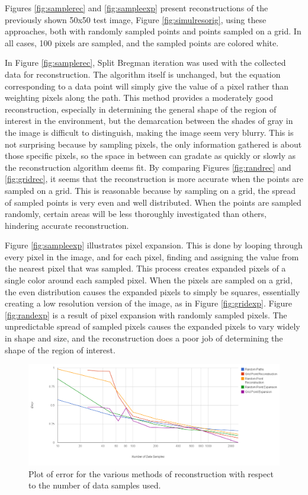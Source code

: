 \documentclass[english]{article}\usepackage[]{graphicx}\usepackage[]{color}
\begin{document}
Figures \ref{fig:samplerec} and \ref{fig:sampleexp} present reconstructions of the previously shown 50x50 test image, Figure \ref{fig:simulresorig}, using these approaches, both with randomly sampled points and points sampled on a grid. In all cases, 100 pixels are sampled, and the sampled points are colored white.

In Figure \ref{fig:samplerec}, Split Bregman iteration was used with the collected data for reconstruction. The algorithm itself is unchanged, but the equation corresponding to a data point will simply give the value of a pixel rather than weighting pixels along the path. This method provides a moderately good reconstruction, especially in determining the general shape of the region of interest in the environment, but the demarcation between the shades of gray in the image is difficult to distinguish, making the image seem very blurry. This is not surprising because by sampling pixels, the only information gathered is about those specific pixels, so the space in between can gradate as quickly or slowly as the reconstruction algorithm deems fit. By comparing Figures \ref{fig:randrec} and \ref{fig:gridrec}, it seems that the reconstruction is more accurate when the points are sampled on a grid. This is reasonable because by sampling on a grid, the spread of sampled points is very even and well distributed. When the points are sampled randomly, certain areas will be less thoroughly investigated than others, hindering accurate reconstruction.

Figure \ref{fig:sampleexp} illustrates pixel expansion. This is done by looping through every pixel in the image, and for each pixel, finding and assigning the value from the nearest pixel that was sampled. This process creates expanded pixels of a single color around each sampled pixel. When the pixels are sampled on a grid, the even distribution causes the expanded pixels to simply be squares, essentially creating a low resolution version of the image, as in Figure \ref{fig:gridexp}. Figure \ref{fig:randexp} is a result of pixel expansion with randomly sampled pixels. The unpredictable spread of sampled pixels causes the expanded pixels to vary widely in shape and size, and the reconstruction does a poor job of determining the shape of the region of interest.

\begin{figure}[H]
\centering
	\includegraphics[width=1\textwidth]{figures/othermethoderror}
\caption{Plot of error for the various methods of reconstruction with respect to the number of data samples used.}
\label{fig:othermethoderror}
\end{figure}
\end{document}
